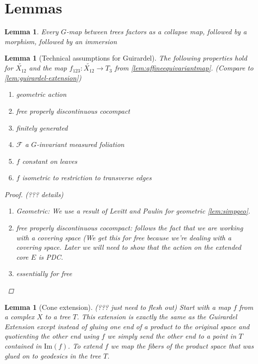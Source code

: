 \documentclass[12pt,parskip=full]{report}
\theoremstyle{plain}
\newtheorem{lem}[thm]{Lemma}
\theoremstyle{definition}
\begin{document}
\section{Lemmas}

\begin{lem}
    \label{lem:gmapfactor}
    Every \(G\)-map between trees factors as a collapse map, followed by a morphism, followed by an immersion
\end{lem}

\begin{lem}
[Technical assumptions for Guirardel]
    \label{lem:technicalconditions}
 The following properties hold for \(\widetilde{ X_{12} }\) and the map \(f_{123}: \widetilde{ X_{12}}\to T_3\) from \ref{lem:affineequivariantmap}. (Compare to \ref{lem:guirardel-extension})
    \begin{enumerate}
        \item geometric action
        \item free properly discontinuous cocompact
        \item finitely generated
        \item \(\mathscr{F}\) a \(G\)-invariant measured foliation
        \item \(f\) constant on leaves
        \item \(f\) isometric to restriction to transverse edges
        
    \end{enumerate}
    
    \begin{proof}
    (??? details)
    \begin{enumerate}
        \item Geometric: We use a result of Levitt and Paulin for geometric \ref{lem:simpgeo}.
        \item free properly discontinuous cocompact: follows the fact that we are working with a covering space (We get this for free because we're dealing with a covering space. Later we will need to show that the action on the extended core $E$ is PDC.
        \item essentially for free
    \end{enumerate}
    \end{proof}
\end{lem}

\begin{lem}
    [Cone extension]
    \label{lem:coneextension}
    (??? just need to flesh out)
    Start with a map $f$ from a complex $X$ to a tree $T$. This extension is exactly the same as the Guirardel Extension except instead of gluing one end of a product to the original space and quotienting the other end using $f$ we simply send the other end to a point in $T$ contained in \(\text{Im}(f)\). To extend $f$ we map the fibers of the product space that was glued on to geodesics in the tree $T$.
\end{lem}
\end{document}
